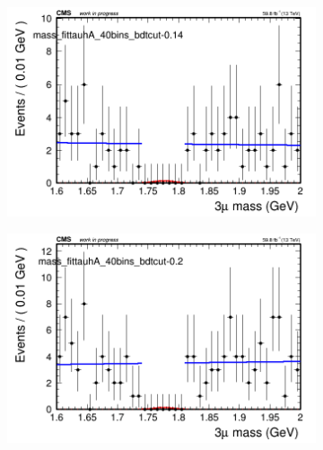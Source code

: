 \begin{figure}[H]
\begin{subfigure}{0.2\textwidth}
        \caption{}
    \end{subfigure}
    \begin{subfigure}{0.2\textwidth}
        \includegraphics[width=\textwidth]{power_law/plots/tauhA/massfit_tauhA_40bins_bdtcut-0.14.png}
        \caption{}
    \end{subfigure}
    \begin{subfigure}{0.2\textwidth}
        \includegraphics[width=\textwidth]{power_law/plots/tauhA/massfit_tauhA_40bins_bdtcut-0.2.png}
        \caption{}
    \end{subfigure}
    \begin{subfigure}{0.2\textwidth}

\end{subfigure}
\end{figure}
